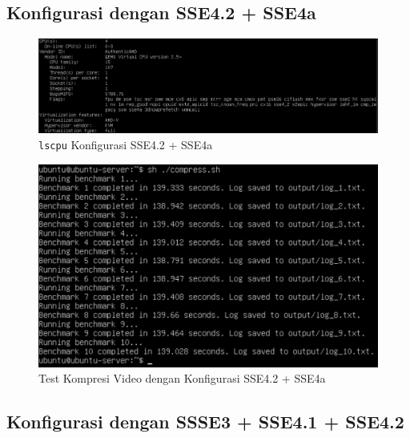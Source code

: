 \subsection{Konfigurasi dengan SSE4.2 + SSE4a}
\begin{figure}
    \centering
    \includegraphics[width=1\textwidth]
    {assets/pics/video-compression-test/lscpu_sse4.2,sse4a.jpeg}
    \caption{\texttt{lscpu} Konfigurasi SSE4.2 + SSE4a}
    \label{fig:lscpu_video_compression_test_sse4.2,sse4a}
\end{figure}

\begin{figure}
    \centering
    \includegraphics[width=1\textwidth]
    {assets/pics/video-compression-test/sse4.2,sse4a.jpeg}
    \caption{Test Kompresi Video dengan Konfigurasi SSE4.2 + SSE4a}
    \label{fig:video_compression_test_sse4.2,sse4a}
\end{figure}

\subsection{Konfigurasi dengan SSSE3 + SSE4.1 + SSE4.2}

